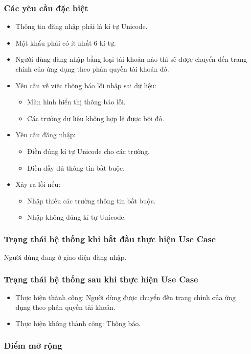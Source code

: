 \subsubsection{Các yêu cầu đặc biệt}
\begin{itemize}
  \item Thông tin đăng nhập phải là kí tự Unicode.
  \item Mật khẩu phải có ít nhất 6 kí tự.
  \item Người dùng đăng nhập bằng loại tài khoản nào thì sẽ được chuyển đến trang chính của ứng dụng theo phân quyền tài khoản đó.
  \item Yêu cầu về việc thông báo lỗi nhập sai dữ liệu:
    \begin{itemize}
      \item Màn hình hiển thị thông báo lỗi.
      \item Các trường dữ liệu không hợp lệ được bôi đỏ.
    \end{itemize}
  \item Yêu cầu đăng nhập:
    \begin{itemize}
      \item Điền đúng kí tự Unicode cho các trường.
      \item Điền đầy đủ thông tin bắt buộc.
    \end{itemize}
  \item Xảy ra lỗi nếu:
    \begin{itemize}
      \item Nhập thiếu các trường thông tin bắt buộc.
      \item Nhập không đúng kí tự Unicode.
    \end{itemize}
\end{itemize}

\subsubsection{Trạng thái hệ thống khi bắt đầu thực hiện Use Case}
Người dùng đang ở giao diện đăng nhập.

\subsubsection{Trạng thái hệ thống sau khi thực hiện Use Case}
\begin{itemize}
  \item Thực hiện thành công: Người dùng được chuyển đến trang chính của ứng dụng theo phân quyền tài khoản.
  \item Thực hiện không thành công: Thông báo.
\end{itemize}

\subsubsection{Điểm mở rộng}
